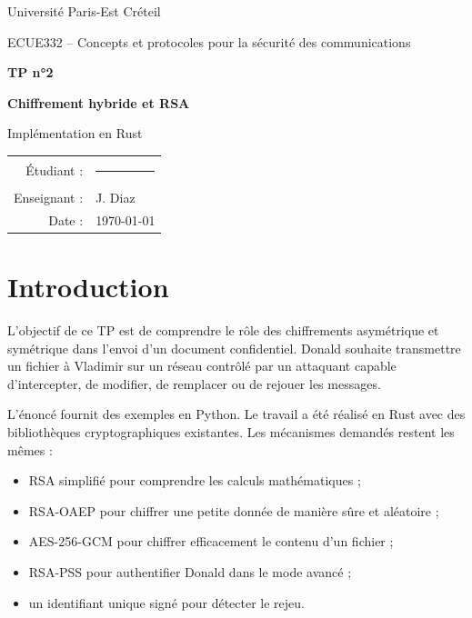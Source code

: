 \documentclass[11pt,a4paper]{article}
\begin{document}

\begin{titlepage}
    \centering
    \vspace*{2cm}
    {\Large Université Paris-Est Créteil\par}
    \vspace{0.5cm}
    {\large ECUE332 -- Concepts et protocoles pour la sécurité des communications\par}
    \vspace{2.2cm}
    {\Huge\bfseries TP n°2\par}
    \vspace{0.4cm}
    {\LARGE\bfseries Chiffrement hybride et RSA\par}
    \vspace{1.5cm}
    {\large Implémentation en Rust\par}
    \vfill
    \begin{tabular}{rl}
        Étudiant : & \rule{8cm}{0.4pt} \\
        Enseignant : & J. Diaz \\
        Date : & \today
    \end{tabular}
    \vfill
\end{titlepage}

\tableofcontents
\newpage
{}

\section{Introduction}

L'objectif de ce TP est de comprendre le rôle des chiffrements asymétrique et
symétrique dans l'envoi d'un document confidentiel. Donald souhaite transmettre
un fichier à Vladimir sur un réseau contrôlé par un attaquant capable d'intercepter,
de modifier, de remplacer ou de rejouer les messages.

L'énoncé fournit des exemples en Python. Le travail a été réalisé en Rust avec des
bibliothèques cryptographiques existantes. Les mécanismes demandés restent les mêmes :

\begin{itemize}
    \item RSA simplifié pour comprendre les calculs mathématiques ;
    \item RSA-OAEP pour chiffrer une petite donnée de manière sûre et aléatoire ;
    \item AES-256-GCM pour chiffrer efficacement le contenu d'un fichier ;
    \item RSA-PSS pour authentifier Donald dans le mode avancé ;
    \item un identifiant unique signé pour détecter le rejeu.
\end{itemize}
\end{document}
